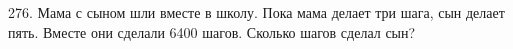 276. Мама с сыном шли вместе в школу. Пока мама делает три шага, сын делает пять. Вместе они сделали 6400 шагов. Сколько шагов сделал сын?\\
